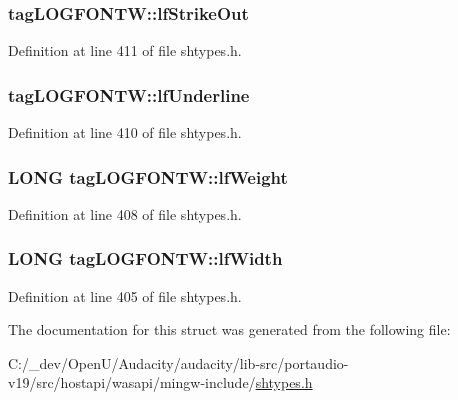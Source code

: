 \subsubsection[{\texorpdfstring{lf\+Strike\+Out}{lfStrikeOut}}]{ tag\+L\+O\+G\+F\+O\+N\+T\+W\+::lf\+Strike\+Out}\hypertarget{structtag_l_o_g_f_o_n_t_w_ac7c4a468e427338cba19c13eff53ae82}{}\label{structtag_l_o_g_f_o_n_t_w_ac7c4a468e427338cba19c13eff53ae82}


Definition at line 411 of file shtypes.\+h.

\subsubsection[{\texorpdfstring{lf\+Underline}{lfUnderline}}]{ tag\+L\+O\+G\+F\+O\+N\+T\+W\+::lf\+Underline}\hypertarget{structtag_l_o_g_f_o_n_t_w_a6fec4ec4b1839f2dfb57f19d5be1066b}{}\label{structtag_l_o_g_f_o_n_t_w_a6fec4ec4b1839f2dfb57f19d5be1066b}


Definition at line 410 of file shtypes.\+h.

\subsubsection[{\texorpdfstring{lf\+Weight}{lfWeight}}]{\setlength{\rightskip}{0pt plus 5cm}L\+O\+NG tag\+L\+O\+G\+F\+O\+N\+T\+W\+::lf\+Weight}\hypertarget{structtag_l_o_g_f_o_n_t_w_acab21c87df8172eb750b34d8e95a9cd3}{}\label{structtag_l_o_g_f_o_n_t_w_acab21c87df8172eb750b34d8e95a9cd3}


Definition at line 408 of file shtypes.\+h.

\subsubsection[{\texorpdfstring{lf\+Width}{lfWidth}}]{\setlength{\rightskip}{0pt plus 5cm}L\+O\+NG tag\+L\+O\+G\+F\+O\+N\+T\+W\+::lf\+Width}\hypertarget{structtag_l_o_g_f_o_n_t_w_a460d30beebfc7a2713374f78236d850f}{}\label{structtag_l_o_g_f_o_n_t_w_a460d30beebfc7a2713374f78236d850f}


Definition at line 405 of file shtypes.\+h.



The documentation for this struct was generated from the following file\+:\begin{DoxyCompactItemize}
\item 
C\+:/\+\_\+dev/\+Open\+U/\+Audacity/audacity/lib-\/src/portaudio-\/v19/src/hostapi/wasapi/mingw-\/include/\hyperlink{shtypes_8h}{shtypes.\+h}\end{DoxyCompactItemize}
